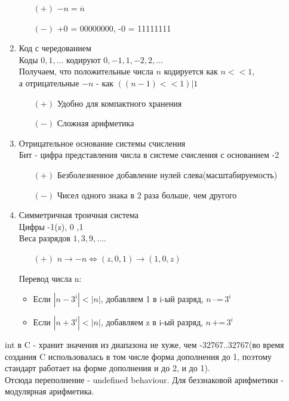 \documentclass[12pt]{article}
\begin{document}
\begin{enumerate}
\begin{itemize}
        \item[$(+)$] $-n = \overline{n}$
        \item[$(-)$] +0 = 00000000, -0 = 11111111
    \end{itemize}
    \item Код с чередованием\\
    Коды $0, 1, \ldots$ кодируют $0, -1, 1, -2, 2, \ldots$\\
    Получаем, что положительные числа $n$ кодируется как $n << 1$,\\
    а отрицательные $-n$ - как $((n-1) << 1) | 1$
    \begin{itemize}
        \item[$(+)$] Удобно для компактного хранения
        \item[$(-)$] Сложная арифметика
    \end{itemize}
    \item Отрицательное основание системы счисления\\
    Бит - цифра представления числа в системе счисления с основанием -2\\
    \begin{itemize}
        \item[$(+)$] Безболезненное добавление нулей слева(масштабируемость)
        \item[$(-)$] Чисел одного знака в 2 раза больше, чем другого
    \end{itemize}
    \item Симметричная троичная система\\
    Цифры -1(z), 0 ,1\\
    Веса разрядов $1, 3, 9, \ldots$.
    \begin{itemize}
        \item[$(+)$] $n \rightarrow -n \Leftrightarrow (z,0,1) \rightarrow (1,0,z)$
    \end{itemize}
    Перевод числа n:
    \begin{itemize}
        \item Если $|n-3^i| < |n|$, добавляем 1 в i-ый разряд, $n\,\text{–=}\,3^i$
        \item Если $|n+3^i| < |n|$, добавляем z в i-ый разряд, $n\,\text{+=}\,3^i$
    \end{itemize}
      
\end{enumerate}
int в C - хранит значения из диапазона не хуже, чем -32767..32767(во время создания C использовалась в том числе форма дополнения до 1, поэтому стандарт работает на форме дополнения и до 2, и до 1). \\Отсюда переполнение - undefined behaviour. Для беззнаковой арифметики - модулярная арифметика.
\end{document}
